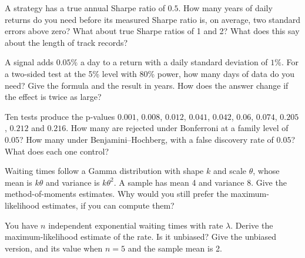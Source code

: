 \begin{question}\label{iq:iv1:statistics:12}
A strategy has a true annual Sharpe ratio of $0.5$. How many years of daily returns do you need before its measured Sharpe ratio is, on average, two standard errors above zero? What about true Sharpe ratios of 1 and 2? What does this say about the length of track records?
\end{question}

\begin{question}\label{iq:iv1:statistics:13}
A signal adds $0.05\%$ a day to a return with a daily standard deviation of $1\%$. For a two-sided test at the 5\% level with 80\% power, how many days of data do you need? Give the formula and the result in years. How does the answer change if the effect is twice as large?
\end{question}

\begin{question}\label{iq:iv1:statistics:14}
Ten tests produce the p-values $0.001$, $0.008$, $0.012$, $0.041$, $0.042$, $0.06$, $0.074$, $0.205$, $0.212$ and $0.216$. How many are rejected under Bonferroni at a family level of $0.05$? How many under Benjamini--Hochberg, with a false discovery rate of $0.05$? What does each one control?
\end{question}

\begin{question}\label{iq:iv1:statistics:15}
Waiting times follow a Gamma distribution with shape $k$ and scale $\theta$, whose mean is $k\theta$ and variance is $k\theta^2$. A sample has mean 4 and variance 8. Give the method-of-moments estimates. Why would you still prefer the maximum-likelihood estimates, if you can compute them?
\end{question}

\begin{question}\label{iq:iv1:statistics:16}
You have $n$ independent exponential waiting times with rate $\lambda$. Derive the maximum-likelihood estimate of the rate. Is it unbiased? Give the unbiased version, and its value when $n = 5$ and the sample mean is 2.
\end{question}

